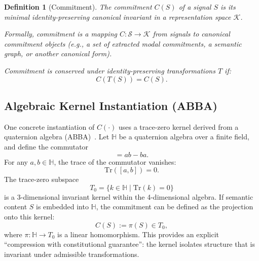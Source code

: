 \documentclass[11pt,a4paper]{article}
\newtheorem{definition}[theorem]{Definition}
\begin{document}
\begin{definition}[Commitment]
\label{def:commitment}
The commitment $C(S)$ of a signal $S$ is its minimal identity-preserving \emph{canonical invariant} in a representation space $\mathcal{K}$.

Formally, commitment is a mapping $C: \mathcal{S} \rightarrow \mathcal{K}$ from signals to canonical commitment objects (e.g., a set of extracted modal commitments, a semantic graph, or another canonical form).

Commitment is conserved under identity-preserving transformations $T$ if:
\begin{equation}
C(T(S)) = C(S).
\end{equation}
\end{definition}

\subsection{Algebraic Kernel Instantiation (ABBA)}
\label{sec:abba-kernel}

One concrete instantiation of $C(\cdot)$ uses a trace-zero kernel derived from a quaternion algebra (ABBA)~\cite{abba2026}. Let $\mathbb{H}$ be a quaternion algebra over a finite field, and define the commutator
\begin{equation}
[a,b] = ab - ba.
\end{equation}
For any $a,b \in \mathbb{H}$, the trace of the commutator vanishes:
\begin{equation}
\mathrm{Tr}([a,b]) = 0.
\end{equation}
The trace-zero subspace
\begin{equation}
T_0 = \{ k \in \mathbb{H} \mid \mathrm{Tr}(k) = 0 \}
\end{equation}
is a 3-dimensional invariant kernel within the 4-dimensional algebra. If semantic content $S$ is embedded into $\mathbb{H}$, the commitment can be defined as the projection onto this kernel:
\begin{equation}
C(S) := \pi(S) \in T_0,
\end{equation}
where $\pi: \mathbb{H} \rightarrow T_0$ is a linear homomorphism. This provides an explicit ``compression with constitutional guarantee'': the kernel isolates structure that is invariant under admissible transformations.
\end{document}
